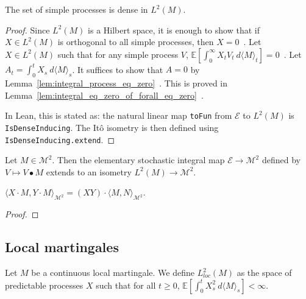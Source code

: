 \begin{lemma}\label{lem:dense_simpleProcess}
The set of simple processes is dense in $L^2(M)$.
\end{lemma}

\begin{proof}
Since $L^2(M)$ is a Hilbert space, it is enough to show that if $X \in L^2(M)$ is orthogonal to all simple processes, then $X = 0$~.
Let $X \in L^2(M)$ such that for any simple process $V$, $\mathbb{E}\left[ \int_0^{\infty} X_t V_t \: d\langle M \rangle_t \right] = 0$~.
Let $A_t = \int_0^t X_s \: d\langle M \rangle_s$.
It suffices to show that $A = 0$ by Lemma~\ref{lem:integral_process_eq_zero}~.
This is proved in Lemma~\ref{lem:integral_eq_zero_of_forall_eq_zero}~.

In Lean, this is stated as: the natural linear map \texttt{toFun} from $\mathcal{E}$ to $L^2(M)$
is \texttt{IsDenseInducing}. The Itô isometry is then defined using \texttt{IsDenseInducing.extend}.
\end{proof}


\begin{definition}\label{def:itoIsometry}
Let $M \in \mathcal{M}^2$. Then the elementary stochastic integral map $\mathcal{E} \to \mathcal{M}^2$ defined by $V \mapsto V \bullet M$ extends to an isometry $L^2(M) \to \mathcal{M}^2$.
\end{definition}


\begin{lemma}\label{lem:inner_itoIsometry}
$\langle X \cdot M, Y \cdot M \rangle_{\mathcal{M}^2} = (XY) \cdot \langle M, N \rangle_{\mathcal{M}^2}$.
\end{lemma}

\begin{proof}

\end{proof}


\subsection{Local martingales}

\begin{definition}[$L^2_{loc}(M)$]\label{def:L2locM}
Let $M$ be a continuous local martingale.
We define $L^2_{loc}(M)$ as the space of predictable processes $X$ such that for all $t \ge 0$, $\mathbb{E}\left[ \int_0^t X_s^2 \: d\langle M \rangle_s \right] < \infty$.
\end{definition}


